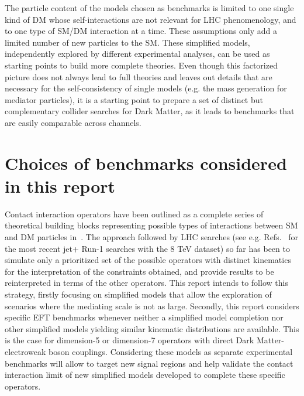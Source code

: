 The particle content of the models chosen as benchmarks is limited to
one single kind of DM whose self-interactions are not relevant for LHC
phenomenology, and to one type of SM/DM interaction at a time. These
assumptions only add a limited number of new particles to the
SM. These simplified models, independently explored by different
experimental analyses, can be used as starting points to build more
complete theories. Even though this factorized picture does not always
lead to full theories and leaves out details that are necessary for
the self-consistency of single models (e.g. the mass generation for
mediator particles), it is a starting point to prepare a set of
distinct but complementary collider searches for Dark Matter, as
it leads to benchmarks that are easily comparable across channels.

\section{Choices of benchmarks considered in this report}

Contact interaction operators have been outlined as a complete series of theoretical
building blocks representing possible types of interactions between SM and DM particles
in~\cite{Goodman:2010ku}. The approach followed by LHC searches (see e.g. Refs.~\cite{Khachatryan:2014rra,Aad:2015zva} 
for the most recent jet+\MET{} Run-1 searches with the 8 TeV dataset) 
so far has been to simulate only a prioritized set of the possible operators with distinct kinematics
for the interpretation of the constraints obtained, and provide results to be reinterpreted in terms of the other operators.
This report intends to follow this strategy, firstly focusing on simplified models that allow the exploration 
of scenarios where the mediating scale is not as large.  
Secondly, this report considers specific EFT benchmarks 
whenever neither a simplified model completion 
nor other simplified models yielding similar kinematic distributions are available. 
This is the case for dimension-5 or dimension-7 operators with direct 
Dark Matter-electroweak boson couplings. 
Considering these models as separate experimental benchmarks 
will allow to target new signal regions and help validate the 
contact interaction limit of new simplified models 
developed to complete these specific operators. 

